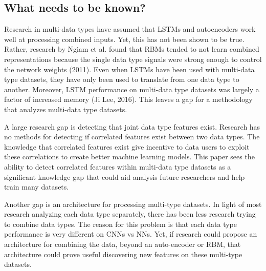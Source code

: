 \subsection{What needs to be known?}

Research in multi-data types have assumed that LSTMs and autoencoders work well at processing combined inputs.  Yet, this has not been shown to be true.  Rather, research by Ngiam et al. found that RBMs tended to not learn combined representations because the single data type signals were strong enough to control the network weights (2011).  Even when LSTMs have been used with multi-data type datasets, they have only been used to translate from one data type to another.  Moreover, LSTM performance on multi-data type datasets was largely a factor of increased memory (Ji Lee, 2016).  This leaves a gap for a methodology that analyzes multi-data type datasets.  

A large research gap is detecting that joint data type features exist.  Research has no methods for detecting if correlated features exist between two data types.  The knowledge that correlated features exist give incentive to data users to exploit these correlations to create better machine learning models.   This paper sees the ability to detect correlated features within multi-data type datasets as a significant knowledge gap that could aid analysis future researchers and help train many datasets.

Another gap is an architecture for processing multi-type datasets. In light of most research analyzing each data type separately, there has been less research trying to combine data types.  The reason for this problem is that each data type performance is very different on CNNs vs NNs.  Yet, if research could propose an architecture for combining the data, beyond an auto-encoder or RBM, that architecture could prove useful discovering new features on these multi-type datasets.
